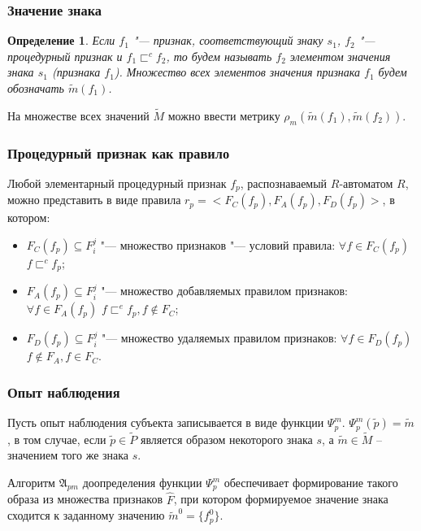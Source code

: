\documentclass[default]{beamer}
\newtheorem{Def}{Определение}
\begin{document}
	\begin{frame}
		\frametitle{Значение знака}
		\begin{Def}
			Если $f_1$ "--- признак, соответствующий знаку $s_1$, $f_2$ "--- процедурный признак и $f_1\sqsubset^c f_2$, то будем называть $f_2$ элементом значения знака $s_1$ (признака $f_1$). Множество всех элементов значения признака $f_1$ будем обозначать $\tilde m(f_1)$.
		\end{Def}
		
		На множестве всех значений $\tilde M$ можно ввести метрику $\rho_m(\tilde m(f_1),\tilde m(f_2))$.
	\end{frame}
	
	\begin{frame}
		\frametitle{Процедурный признак как правило}
		Любой элементарный процедурный признак $f_p$, распознаваемый $R$-автоматом $R$, можно представить в виде правила $r_p=<F_C(f_p),F_A(f_p),F_D(f_p)>$, в котором:
		\begin{itemize}
			\item $F_C (f_p )\subseteq F_i^j$ "--- множество признаков "--- условий правила: $\forall f\in F_C(f_p)$ $f\sqsubset^c f_p$;
			\item $F_A(f_p)\subseteq F_i^j$ "--- множество добавляемых правилом признаков: $\forall f\in F_A(f_p)$ $f\sqsubset^e f_p,f\notin F_C$;
			\item $F_D(f_p)\subseteq F_i^j$ "--- множество удаляемых правилом признаков: $\forall f\in F_D(f_p)$ $f\notin F_A,f\in F_C$.
		\end{itemize}
	\end{frame}
	
	\begin{frame}
		\frametitle{Опыт наблюдения}
		Пусть опыт наблюдения субъекта записывается в виде функции $\Psi_p^m$. $\Psi_p^m(\tilde p)=\tilde m$, в том случае, если $\tilde p\in\tilde P$ является образом некоторого знака $s$, а $\tilde m\in\tilde M$ -- значением того же знака $s$.
		\par\bigskip
		Алгоритм $\mathfrak A_{pm}$ доопределения функции $\Psi_p^m$ обеспечивает формирование такого образа из множества признаков $\hat F$, при котором формируемое значение знака сходится к заданному значению $\tilde m^0=\{f_p^0\}$.
	\end{frame}
	
\end{document}
